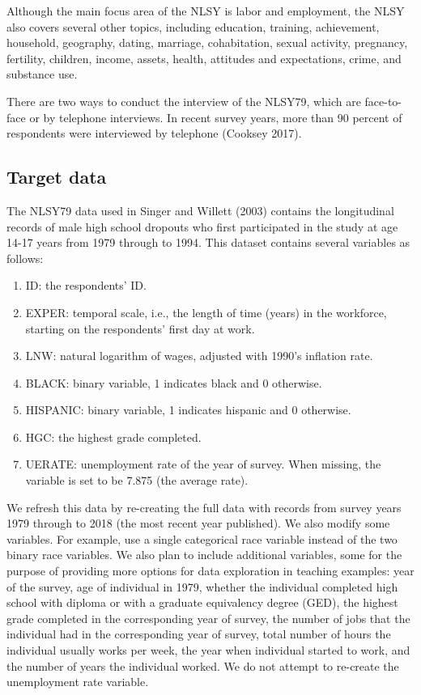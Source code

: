 \documentclass{article}
\providecommand{\tightlist}{%
  \setlength{\itemsep}{0pt}\setlength{\parskip}{0pt}}
\begin{document}
Although the main focus area of the NLSY is labor and employment, the NLSY also covers several other topics, including education, training, achievement, household, geography, dating, marriage, cohabitation, sexual activity, pregnancy, fertility, children, income, assets, health, attitudes and expectations, crime, and substance use.

There are two ways to conduct the interview of the NLSY79, which are face-to-face or by telephone interviews. In recent survey years, more than 90 percent of respondents were interviewed by telephone (Cooksey 2017).

\hypertarget{target}{%
\subsection{Target data}\label{target}}

The NLSY79 data used in Singer and Willett (2003) contains the longitudinal records of male high school dropouts who first participated in the study at age 14-17 years from 1979 through to 1994. This dataset contains several variables as follows:

\begin{enumerate}
\def\labelenumi{\arabic{enumi}.}
\tightlist
\item
  ID: the respondents' ID.
\item
  EXPER: temporal scale, i.e., the length of time (years) in the workforce, starting on the respondents' first day at work.
\item
  LNW: natural logarithm of wages, adjusted with 1990's inflation rate.
\item
  BLACK: binary variable, 1 indicates black and 0 otherwise.
\item
  HISPANIC: binary variable, 1 indicates hispanic and 0 otherwise.
\item
  HGC: the highest grade completed.
\item
  UERATE: unemployment rate of the year of survey. When missing, the variable is set to be 7.875 (the average rate).
\end{enumerate}

We refresh this data by re-creating the full data with records from survey years 1979 through to 2018 (the most recent year published). We also modify some variables. For example, use a single categorical race variable instead of the two binary race variables. We also plan to include additional variables, some for the purpose of providing more options for data exploration in teaching examples: year of the survey, age of individual in 1979, whether the individual completed high school with diploma or with a graduate equivalency degree (GED), the highest grade completed in the corresponding year of survey, the number of jobs that the individual had in the corresponding year of survey, total number of hours the individual usually works per week, the year when individual started to work, and the number of years the individual worked. We do not attempt to re-create the unemployment rate variable.
\end{document}
